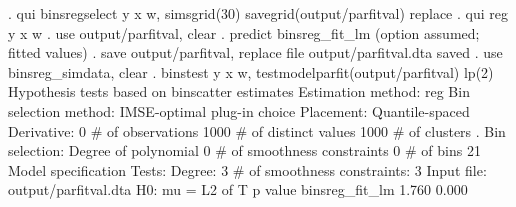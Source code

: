 . qui binsregselect y x w, simsgrid(30) savegrid(output/parfitval) replace
{\smallskip}
. qui reg y x w
{\smallskip}
. use output/parfitval, clear
{\smallskip}
. predict binsreg_fit_lm
(option {} assumed; fitted values)
{\smallskip}
. save output/parfitval, replace
file output/parfitval.dta saved
{\smallskip}
. use binsreg_simdata, clear
{\smallskip}
. binstest y x w, testmodelparfit(output/parfitval) lp(2)
{\smallskip}
Hypothesis tests based on binscatter estimates
Estimation method: reg
Bin selection method: IMSE-optimal plug-in choice
Placement: Quantile-spaced
Derivative: 0
{\smallskip}
\# of observations             {\VBAR}    1000
\# of distinct values          {\VBAR}    1000
\# of clusters                 {\VBAR}       .
Bin selection:                {\VBAR} 
         Degree of polynomial {\VBAR}       0
  \# of smoothness constraints {\VBAR}       0
                    \# of bins {\VBAR}      21
{\smallskip}
Model specification Tests:
Degree: 3     \# of smoothness constraints: 3
{\smallskip}
Input file: output/parfitval.dta
H0: mu =           {\VBAR} L2 of T           p value
   binsreg_fit_lm  {\VBAR}   1.760             0.000

